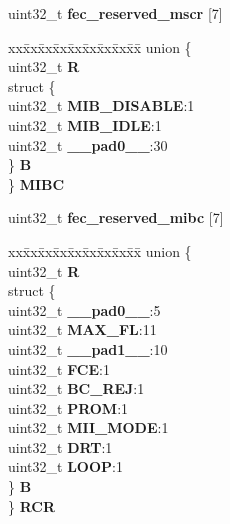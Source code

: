 \begin{DoxyCompactItemize}
\begin{tabbing}
\end{tabbing}\item 
\mbox{\label{structFEC__tag_aa1e2edae15d523c79e7edd15c22a00be}} 
uint32\+\_\+t {\bfseries fec\+\_\+reserved\+\_\+mscr} \mbox{[}7\mbox{]}
\item 
\mbox{\label{structFEC__tag_aaf55691e09a772cd295cbe668ab37da8}} 
\begin{tabbing}
xx\=xx\=xx\=xx\=xx\=xx\=xx\=xx\=xx\=\kill
union \{\\
\>uint32\_t {\bfseries R}\\
\>struct \{\\
\>\>uint32\_t {\bfseries MIB\_DISABLE}:1\\
\>\>uint32\_t {\bfseries MIB\_IDLE}:1\\
\>\>uint32\_t {\bfseries \_\_pad0\_\_}:30\\
\>\} {\bfseries B}\\
\} {\bfseries MIBC}\\

\end{tabbing}\item 
\mbox{\label{structFEC__tag_a73e9a5d87ec6eeae46759a9dfbcee430}} 
uint32\+\_\+t {\bfseries fec\+\_\+reserved\+\_\+mibc} \mbox{[}7\mbox{]}
\item 
\mbox{\label{structFEC__tag_a84517e55d93ccb9633825dd3c4eadf80}} 
\begin{tabbing}
xx\=xx\=xx\=xx\=xx\=xx\=xx\=xx\=xx\=\kill
union \{\\
\>uint32\_t {\bfseries R}\\
\>struct \{\\
\>\>uint32\_t {\bfseries \_\_pad0\_\_}:5\\
\>\>uint32\_t {\bfseries MAX\_FL}:11\\
\>\>uint32\_t {\bfseries \_\_pad1\_\_}:10\\
\>\>uint32\_t {\bfseries FCE}:1\\
\>\>uint32\_t {\bfseries BC\_REJ}:1\\
\>\>uint32\_t {\bfseries PROM}:1\\
\>\>uint32\_t {\bfseries MII\_MODE}:1\\
\>\>uint32\_t {\bfseries DRT}:1\\
\>\>uint32\_t {\bfseries LOOP}:1\\
\>\} {\bfseries B}\\
\} {\bfseries RCR}\\


\end{tabbing}
\end{DoxyCompactItemize}
